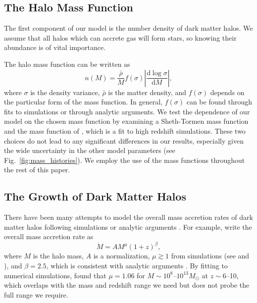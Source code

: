 \documentclass[a4paper,fleqn,usenatbib]{mnras}
\begin{document}
\subsection{The Halo Mass Function}

The first component 
of our model is the number density of dark matter halos. We assume that all halos which can accrete gas will form stars, so knowing their abundance is of vital importance.

The halo mass function can be written as
\begin{equation}
n(M) = \frac{\bar{\rho}}{M} f(\sigma) 
\left| \frac{\text{d}\log{\sigma}}{\text{d}M}\right|,
\end{equation}
where $\sigma$ is the density variance, $\bar{\rho}$ is the matter density, and $f(\sigma)$ depends on the particular form of the mass function.  In general, $f(\sigma)$ can be found through fits to simulations or through analytic arguments. We test the dependence of our model on the chosen mass function by examining a Sheth-Tormen mass function \citep{sheth_tormen} and the mass function of \citet{trac_2015},  which is a fit to high redshift simulations. 
These two choices do not lead to any 
significant differences in our results, especially given the wide uncertainty in the other model parameters (see Fig.~\ref{fig:mass_histories}). We employ the use of the \citet{trac_2015} mass functions throughout the rest of this paper.

\subsection{The Growth of Dark Matter Halos}
\label{sec:growth}

There have been many attempts to model the overall mass accretion rates of dark matter halos following simulations or analytic arguments \citep[e.g.,][]{mcbride_2009, behroozi_2013, dekel_2013, goerdt_2015}.  For example, \citet{dekel_2013} write the overall mass accretion rate as
\begin{equation}
\dot{M} = A M^{\mu} \left( 1 + z \right)^{\beta},
\label{eq:mdot}
\end{equation}
where $M$ is the halo mass, $A$ is a normalization, $\mu \gtrsim 1$ from simulations (see \citealt{mcbride_2009} and \citealt{trac_2015}), and $\beta = 2.5$, which is consistent with analytic arguments \citep[e.g.,][]{neistein_2008}. 
By fitting to numerical simulations, \citet{trac_2015} found that $\mu = 1.06$ for $M \sim 10^8$--$10^{13} M_\odot$ at $z \sim 6$--10, which overlaps with the mass and redshift range we need but does not probe the full range we require.
\end{document}
